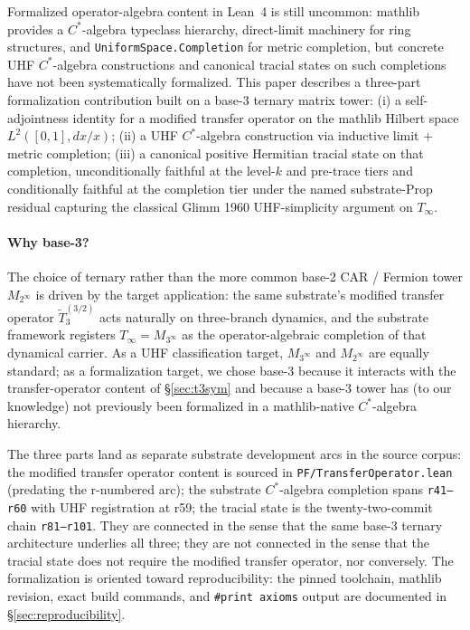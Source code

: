\documentclass[11pt,a4paper]{amsart}
\theoremstyle{plain}
\theoremstyle{definition}
\begin{document}
Formalized operator-algebra content in Lean~4 is still uncommon: mathlib provides a $C^*$-algebra typeclass hierarchy, direct-limit machinery for ring structures, and \texttt{UniformSpace.Completion} for metric completion, but concrete UHF $C^*$-algebra constructions and canonical tracial states on such completions have not been systematically formalized. This paper describes a three-part formalization contribution built on a base-3 ternary matrix tower: (i) a self-adjointness identity for a modified transfer operator on the mathlib Hilbert space $L^2([0,1], dx/x)$; (ii) a UHF $C^*$-algebra construction via inductive limit + metric completion; (iii) a canonical positive Hermitian tracial state on that completion, unconditionally faithful at the level-$k$ and pre-trace tiers and conditionally faithful at the completion tier under the named substrate-Prop residual capturing the classical Glimm 1960 UHF-simplicity argument on $T_\infty$.

\paragraph{Why base-3?} The choice of ternary rather than the more common base-2 CAR / Fermion tower $M_{2^\infty}$ is driven by the target application: the same substrate's modified transfer operator $\widetilde{T}_3^{(3/2)}$ acts naturally on three-branch dynamics, and the substrate framework registers $T_\infty = M_{3^\infty}$ as the operator-algebraic completion of that dynamical carrier. As a UHF classification target, $M_{3^\infty}$ and $M_{2^\infty}$ are equally standard; as a formalization target, we chose base-3 because it interacts with the transfer-operator content of \S\ref{sec:t3sym} and because a base-3 tower has (to our knowledge) not previously been formalized in a mathlib-native $C^*$-algebra hierarchy.

The three parts land as separate substrate development arcs in the source corpus: the modified transfer operator content is sourced in \texttt{PF/TransferOperator.lean} (predating the r-numbered arc); the substrate $C^*$-algebra completion spans \texttt{r41--r60} with UHF registration at r59; the tracial state is the twenty-two-commit chain \texttt{r81--r101}. They are connected in the sense that the same base-3 ternary architecture underlies all three; they are not connected in the sense that the tracial state does not require the modified transfer operator, nor conversely. The formalization is oriented toward reproducibility: the pinned toolchain, mathlib revision, exact build commands, and \texttt{\#print axioms} output are documented in \S\ref{sec:reproducibility}.
\end{document}
